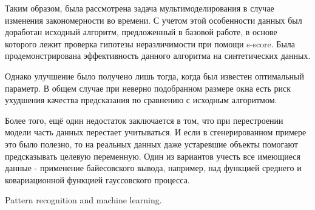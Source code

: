 \documentclass[12pt,twoside]{article}
\begin{document}
Таким образом, была рассмотрена задача мультимоделирования в случае изменения закономерности во времени. С учетом этой особенности данных был доработан исходный алгоритм, предложенный в базовой работе, в основе которого лежит проверка гипотезы неразличимости при помощи s-score. Была продемонстрирована эффективность данного алгоритма на синтетических данных.

Однако улучшение было получено лишь тогда, когда был известен оптимальный параметр. В общем случае при неверно подобранном размере окна есть риск ухудшения качества предсказания по сравнению с исходным алгоритмом.

Более того, ещё один недостаток заключается в том, что при перестроении модели часть данных перестает учитываться. И если в сгенерированном примере это было полезно, то на реальных данных даже устаревшие объекты помогают предсказывать целевую переменную. Один из вариантов учесть все имеющиеся данные - применение байесовского вывода, например, над функцией среднего и ковариационной функцией гауссовского процесса.



\begin{thebibliography}{1}





    Pattern recognition and machine learning.


\end{thebibliography}
\end{document}
